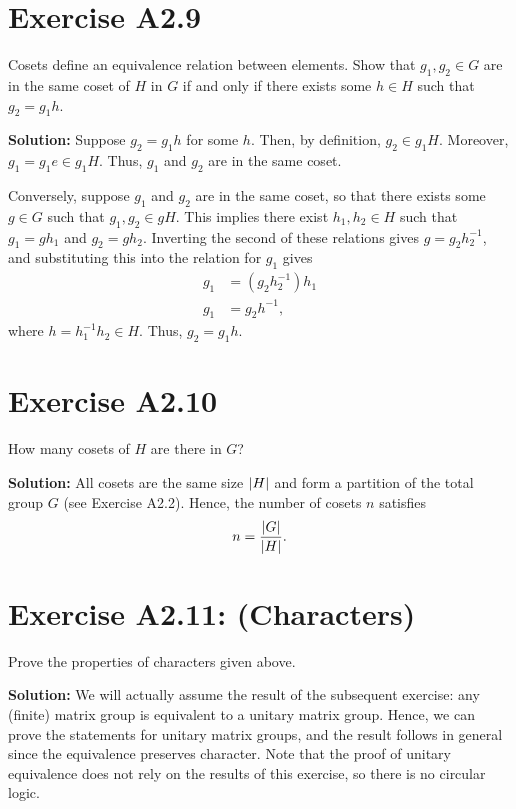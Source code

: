 \documentclass{book}
\begin{document}
\section*{Exercise A2.9}
    Cosets define an equivalence relation between elements. Show that $g_1, g_2 \in G$ are in the same coset of $H$ in $G$ if and only if there exists some $h\in H$ such that $g_2 = g_1 h$.
    
    \textbf{Solution:} Suppose $g_2 = g_1 h$ for some $h$. Then, by definition, $g_2 \in g_1 H$. Moreover, $g_1 = g_1 e \in g_1 H$. Thus, $g_1$ and $g_2$ are in the same coset.
    
    Conversely, suppose $g_1$ and $g_2$ are in the same coset, so that there exists some $g\in G$ such that $g_1, g_2 \in gH$. This implies there exist $h_1, h_2 \in H$ such that $g_1 = g h_1$ and $g_2 = g h_2$. Inverting the second of these relations gives $g = g_2 h_2^{-1}$, and substituting this into the relation for $g_1$ gives
    \begin{align}
        g_1 &= (g_2 h_2^{-1})h_1 \\
        g_1 &= g_2 h^{-1},
    \end{align}
    where $h = h_1^{-1}h_2\in H$. Thus, $g_2 = g_1 h$.
    
\section*{Exercise A2.10}
    How many cosets of $H$ are there in $G$?
    
    \textbf{Solution:} All cosets are the same size $\abs{H}$ and form a partition of the total group $G$ (see Exercise A2.2). Hence, the number of cosets $n$ satisfies
    \begin{align}
        n = \frac{\abs{G}}{\abs{H}}.
    \end{align}

\section*{Exercise A2.11: (Characters)}
    Prove the properties of characters given above.
    
    \textbf{Solution:} We will actually assume the result of the subsequent exercise: any (finite) matrix group is equivalent to a unitary matrix group. Hence, we can prove the statements for unitary matrix groups, and the result follows in general since the equivalence preserves character. Note that the proof of unitary equivalence does not rely on the results of this exercise, so there is no circular logic. 
    
\end{document}
